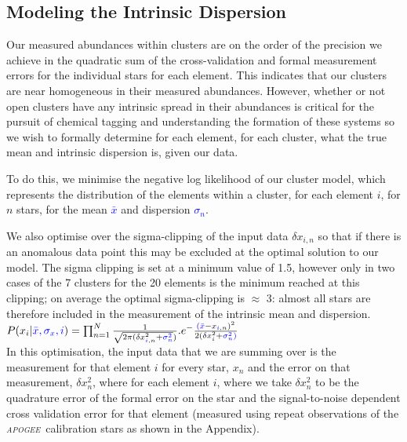 \documentclass[14pt, preprint2]{aastex6}
\newcommand{\project}[1]{\textsl{#1}}
\newcommand{\apogee}{\project{\textsc{apogee}}}
\begin{document}
\subsection{Modeling the Intrinsic Dispersion}

Our measured abundances within clusters are on the order of the precision we achieve in the quadratic sum of the cross-validation and formal measurement errors for the individual stars for each element. This indicates that our clusters are near homogeneous in their measured abundances. However, whether or not open clusters have any intrinsic spread in their abundances is critical for the pursuit of chemical tagging and understanding the formation of these systems \citep[][]{Bovy2016, Lui2016} so we wish to formally determine for each element, for each cluster, what the true mean and intrinsic dispersion is, given our data. 

To do this, we minimise the negative log likelihood of our cluster model, which represents the distribution of the elements within a cluster, for each element $i$, for $n$ stars, for the mean \textcolor{blue}{$\bar{x}$} and dispersion \textcolor{blue}{$\sigma_n$}. 

We also optimise over the sigma-clipping of the input data $\delta x_{i, n}$ so that if there is an anomalous data point this may be excluded at the optimal solution to our model.  The sigma clipping is set at a minimum value of 1.5, however only in two cases of the 7 clusters for the 20 elements is the minimum reached at this clipping; on average the optimal sigma-clipping is $\approx$ 3: almost all stars are therefore included in the measurement of the intrinsic mean and dispersion.\\

$P({x_i} | \textcolor{blue}{\bar{x}, \sigma_x, i }) =  \prod_{n=1}^{N} \frac{1}{\sqrt{2 \pi (\delta x_{ \textcolor{blue}{i}, n} ^2 + \textcolor{blue}{{\sigma}_n^2}})} . e ^ - {\frac{\textcolor{blue}{(\bar{x}} - x_{\textcolor{blue}{i}, n})^2 }{2(\delta x_i^2 + \textcolor{blue}{\sigma_n^2)}}}$ \\

In this optimisation, the input data that we are summing over is the measurement for that element $i$ for every star, $x_n$  and the error on that measurement, $\delta x_n^2$, where for each element $i$, where we take $\delta x_n^2$ to be the quadrature error of the formal error on the star and the signal-to-noise dependent cross validation error for that element (measured using repeat observations of the \apogee\ calibration stars as shown in the Appendix). 
\end{document}
